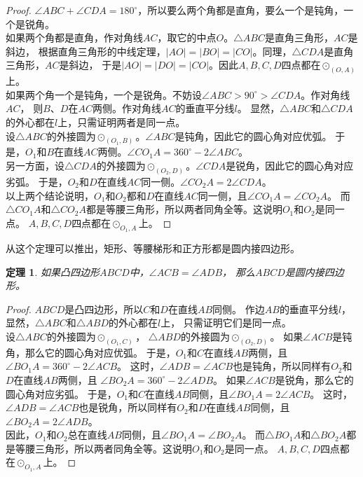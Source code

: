 \documentclass[12pt,UTF8]{ctexbook}
\newtheorem{tm}{定理}[section]
\begin{document}
\begin{proof}
    $\angle ABC + \angle CDA = 180^\circ$，所以要么两个角都是直角，要么一个是钝角，一个是锐角。\\
    如果两个角都是直角，作对角线$AC$，取它的中点$O$。$\triangle ABC$是直角三角形，$AC$是斜边，
    根据直角三角形的中线定理，$|AO| = |BO| = |CO|$。同理，$\triangle CDA$是直角三角形，$AC$是斜边，
    于是$|AO| = |DO| = |CO|$。因此$A,B,C,D$四点都在$\odot_{(O, A)}$上。\\
    如果两个角一个是钝角，一个是锐角。不妨设$\angle ABC > 90^\circ > \angle CDA$。作对角线$AC$，
    则$B$、$D$在$AC$两侧。作对角线$AC$的垂直平分线$l$。
    显然，$\triangle ABC$和$\triangle CDA$的外心都在$l$上，只需证明两者是同一点。\\
    设$\triangle ABC$的外接圆为$\odot_{(O_1, B)}$。$\angle ABC$是钝角，因此它的圆心角对应优弧。
    于是，$O_1$和$B$在直线$AC$两侧。$\angle CO_1A = 360^\circ - 2\angle ABC$。\\
    另一方面，设$\triangle CDA$的外接圆为$\odot_{(O_2, D)}$。$\angle CDA$是锐角，因此它的圆心角对应劣弧。
    于是，$O_2$和$D$在直线$AC$同一侧。$\angle CO_2A = 2\angle CDA$。\\
    以上两个结论说明，$O_1$和$O_2$都和$D$在直线$AC$同一侧，且$\angle CO_1A = \angle CO_2A$。
    而$\triangle CO_1A$和$\triangle CO_2A$都是等腰三角形，所以两者同角全等。这说明$O_1$和$O_2$是同一点。
    $A,B,C,D$四点都在$\odot_{O_1, A}$上。
\end{proof}

从这个定理可以推出，矩形、等腰梯形和正方形都是圆内接四边形。

\begin{tm}\label{tm:1-1-10}
    如果凸四边形$ABCD$中，$\angle ACB = \angle ADB$，
    那么$ABCD$是圆内接四边形。
\end{tm}

\begin{proof}
    $ABCD$是凸四边形，所以$C$和$D$在直线$AB$同侧。
    作边$AB$的垂直平分线$l$，显然，$\triangle ABC$和$\triangle ABD$的外心都在$l$上，
    只需证明它们是同一点。\\
    设$\triangle ABC$的外接圆为$\odot_{(O_1, C)}$，
    $\triangle ABD$的外接圆为$\odot_{(O_2, D)}$。
    如果$\angle ACB$是钝角，那么它的圆心角对应优弧。
    于是，$O_1$和$C$在直线$AB$两侧，且$\angle BO_1A = 360^\circ - 2\angle ACB$。
    这时，$\angle ADB = \angle ACB$也是钝角，所以同样有$O_2$和$D$在直线$AB$两侧，且
    $\angle BO_2A = 360^\circ - 2\angle ADB$。
    如果$\angle ACB$是锐角，那么它的圆心角对应劣弧。
    于是，$O_1$和$C$在直线$AB$同侧，且$\angle BO_1A = 2\angle ACB$。
    这时，$\angle ADB = \angle ACB$也是锐角，所以同样有$O_2$和$D$在直线$AB$同侧，且
    $\angle BO_2A = 2\angle ADB$。\\
    因此，$O_1$和$O_2$总在直线$AB$同侧，且$\angle BO_1A = \angle BO_2A$。
    而$\triangle BO_1A$和$\triangle BO_2A$都是等腰三角形，所以两者同角全等。这说明$O_1$和$O_2$是同一点。
    $A,B,C,D$四点都在$\odot_{O_1, A}$上。
\end{proof}
\end{document}

